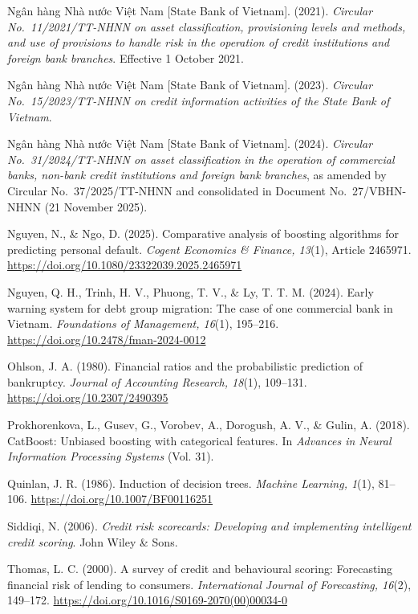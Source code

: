 \documentclass[11pt,a4paper]{article}
\newcommand{\refitem}[1]{\par\noindent\hangindent=1cm\hangafter=1 #1\par\smallskip}
\begin{document}
\refitem{Ngân hàng Nhà nước Việt Nam [State Bank of Vietnam]. (2021). \textit{Circular No.\ 11/2021/TT-NHNN on asset classification, provisioning levels and methods, and use of provisions to handle risk in the operation of credit institutions and foreign bank branches}. Effective 1 October 2021.}

\refitem{Ngân hàng Nhà nước Việt Nam [State Bank of Vietnam]. (2023). \textit{Circular No.\ 15/2023/TT-NHNN on credit information activities of the State Bank of Vietnam}.}

\refitem{Ngân hàng Nhà nước Việt Nam [State Bank of Vietnam]. (2024). \textit{Circular No.\ 31/2024/TT-NHNN on asset classification in the operation of commercial banks, non-bank credit institutions and foreign bank branches}, as amended by Circular No.\ 37/2025/TT-NHNN and consolidated in Document No.\ 27/VBHN-NHNN (21 November 2025).}

\refitem{Nguyen, N., \& Ngo, D. (2025). Comparative analysis of boosting algorithms for predicting personal default. \textit{Cogent Economics \& Finance, 13}(1), Article 2465971. \url{https://doi.org/10.1080/23322039.2025.2465971}}

\refitem{Nguyen, Q. H., Trinh, H. V., Phuong, T. V., \& Ly, T. T. M. (2024). Early warning system for debt group migration: The case of one commercial bank in Vietnam. \textit{Foundations of Management, 16}(1), 195--216. \url{https://doi.org/10.2478/fman-2024-0012}}

\refitem{Ohlson, J. A. (1980). Financial ratios and the probabilistic prediction of bankruptcy. \textit{Journal of Accounting Research, 18}(1), 109--131. \url{https://doi.org/10.2307/2490395}}

\refitem{Prokhorenkova, L., Gusev, G., Vorobev, A., Dorogush, A. V., \& Gulin, A. (2018). CatBoost: Unbiased boosting with categorical features. In \textit{Advances in Neural Information Processing Systems} (Vol. 31).}

\refitem{Quinlan, J. R. (1986). Induction of decision trees. \textit{Machine Learning, 1}(1), 81--106. \url{https://doi.org/10.1007/BF00116251}}

\refitem{Siddiqi, N. (2006). \textit{Credit risk scorecards: Developing and implementing intelligent credit scoring}. John Wiley \& Sons.}

\refitem{Thomas, L. C. (2000). A survey of credit and behavioural scoring: Forecasting financial risk of lending to consumers. \textit{International Journal of Forecasting, 16}(2), 149--172. \url{https://doi.org/10.1016/S0169-2070(00)00034-0}}
\end{document}
